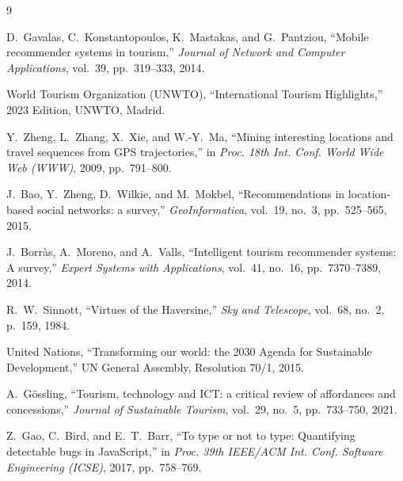 \documentclass[conference]{IEEEtran}
\begin{document}
\begin{thebibliography}{9}

D.~Gavalas, C.~Konstantopoulos, K.~Mastakas, and G.~Pantziou, ``Mobile recommender systems in tourism,'' \textit{Journal of Network and Computer Applications}, vol.~39, pp.~319--333, 2014.

World Tourism Organization (UNWTO), ``International Tourism Highlights,'' 2023 Edition, UNWTO, Madrid.

Y.~Zheng, L.~Zhang, X.~Xie, and W.-Y.~Ma, ``Mining interesting locations and travel sequences from GPS trajectories,'' in \textit{Proc. 18th Int. Conf. World Wide Web (WWW)}, 2009, pp.~791--800.

J.~Bao, Y.~Zheng, D.~Wilkie, and M.~Mokbel, ``Recommendations in location-based social networks: a survey,'' \textit{GeoInformatica}, vol.~19, no.~3, pp.~525--565, 2015.

J.~Borr\`{a}s, A.~Moreno, and A.~Valls, ``Intelligent tourism recommender systems: A survey,'' \textit{Expert Systems with Applications}, vol.~41, no.~16, pp.~7370--7389, 2014.

R.~W.~Sinnott, ``Virtues of the Haversine,'' \textit{Sky and Telescope}, vol.~68, no.~2, p.~159, 1984.

United Nations, ``Transforming our world: the 2030 Agenda for Sustainable Development,'' UN General Assembly, Resolution 70/1, 2015.

A.~G\"{o}ssling, ``Tourism, technology and ICT: a critical review of affordances and concessions,'' \textit{Journal of Sustainable Tourism}, vol.~29, no.~5, pp.~733--750, 2021.

Z.~Gao, C.~Bird, and E.~T.~Barr, ``To type or not to type: Quantifying detectable bugs in JavaScript,'' in \textit{Proc. 39th IEEE/ACM Int. Conf. Software Engineering (ICSE)}, 2017, pp.~758--769.

\end{thebibliography}
\end{document}
